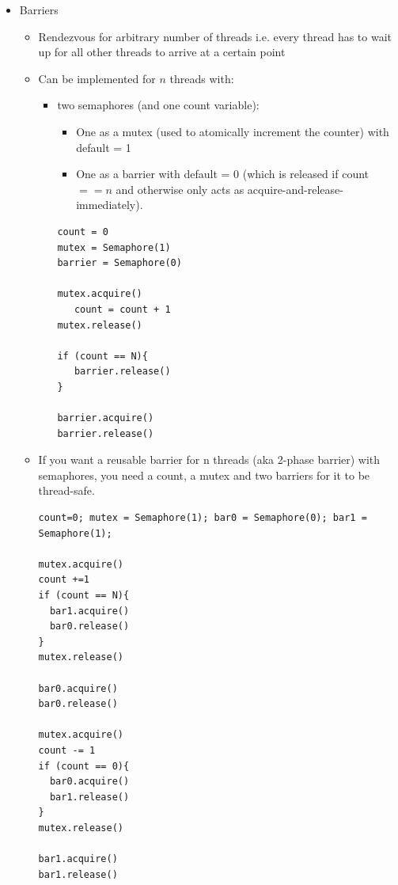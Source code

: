 \documentclass[a4paper]{article}
\begin{document}
\begin{itemize}
\item Barriers
\begin{itemize}
\item Rendezvous for arbitrary number of threads i.e. every thread has to wait up for all other threads to arrive at a certain point
\item Can be implemented for $n$ threads with:
\begin{itemize}
\item  two semaphores (and one count variable): 
\begin{itemize}
\item One as a mutex (used to atomically increment the counter) with default = 1 
\item One as a barrier with default = 0 (which is released if count $== n$ and otherwise only acts as acquire-and-release-immediately).
\end{itemize}

\begin{lstlisting}
count = 0
mutex = Semaphore(1)
barrier = Semaphore(0)

mutex.acquire()
   count = count + 1
mutex.release()

if (count == N){
   barrier.release()
}

barrier.acquire()
barrier.release()
\end{lstlisting}
\end{itemize}
\item If you want a reusable barrier for n threads (aka 2-phase barrier) with semaphores, you need a count, a mutex and two barriers for it to be thread-safe.
\begin{lstlisting}
count=0; mutex = Semaphore(1); bar0 = Semaphore(0); bar1 = Semaphore(1);

mutex.acquire()
count +=1
if (count == N){
  bar1.acquire()
  bar0.release()
}
mutex.release()

bar0.acquire()
bar0.release()

mutex.acquire()
count -= 1
if (count == 0){
  bar0.acquire()
  bar1.release()
}
mutex.release()

bar1.acquire()
bar1.release()
\end{lstlisting}

\end{itemize}


\end{itemize}
\end{document}
